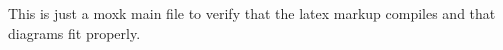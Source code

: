 \documentclass{article}
\begin{document}
This is just a moxk main file to verify that the latex markup compiles and that diagrams fit properly.
	
\end{document}
